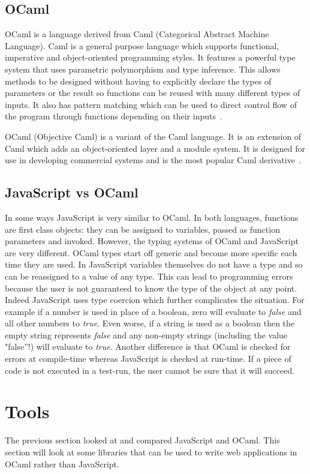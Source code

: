 \subsection{OCaml}
OCaml is a language derived from Caml (Categorical Abstract Machine Language). Caml is a general purpose language which supports functional, imperative and object-oriented programming styles. It features a powerful type system that uses parametric polymorphism and type inference. This allows methods to be designed without having to explicitly declare the types of parameters or the result so functions can be reused with many different types of inputs. It also has pattern matching which can be used to direct control flow of the program through functions depending on their inputs~\cite{bib:caml}.

OCaml (Objective Caml) is a variant of the Caml language. It is an extension of Caml which adds an object-oriented layer and a module system. It is designed for use in developing commercial systems and is the most popular Caml derivative~\cite{bib:ocaml}.

\subsection{JavaScript vs OCaml}
In some ways JavaScript is very similar to OCaml. In both languages, functions are first class objects: they can be assigned to variables, passed as function parameters and invoked. However, the typing systems of OCaml and JavaScript are very different. OCaml types start off generic and become more specific each time they are used. In JavaScript variables themselves do not have a type and so can be reassigned to a value of any type. This can lead to programming errors because the user is not guaranteed to know the type of the object at any point. Indeed JavaScript uses type coercion which further complicates the situation. For example if a number is used in place of a boolean, zero will evaluate to \emph{false} and all other numbers to \emph{true}. Even worse, if a string is used as a boolean then the empty string represents \emph{false} and any non-empty strings (including the value "false''!) will evaluate to \emph{true}. Another difference is that OCaml is checked for errors at compile-time whereas JavaScript is checked at run-time. If a piece of code is not executed in a test-run, the user cannot be sure that it will succeed.

\section{Tools}
The previous section looked at and compared JavaScript and OCaml. This section will look at some libraries that can be used to write web applications in OCaml rather than JavaScript.

